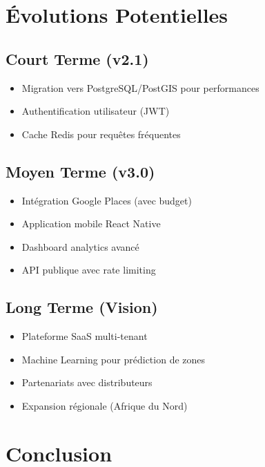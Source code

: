 \documentclass[11pt,a4paper]{article}
\begin{document}
\section{Évolutions Potentielles}

\subsection{Court Terme (v2.1)}

\begin{itemize}[leftmargin=*]
    \item Migration vers PostgreSQL/PostGIS pour performances
    \item Authentification utilisateur (JWT)
    \item Cache Redis pour requêtes fréquentes
\end{itemize}

\subsection{Moyen Terme (v3.0)}

\begin{itemize}[leftmargin=*]
    \item Intégration Google Places (avec budget)
    \item Application mobile React Native
    \item Dashboard analytics avancé
    \item API publique avec rate limiting
\end{itemize}

\subsection{Long Terme (Vision)}

\begin{itemize}[leftmargin=*]
    \item Plateforme SaaS multi-tenant
    \item Machine Learning pour prédiction de zones
    \item Partenariats avec distributeurs
    \item Expansion régionale (Afrique du Nord)
\end{itemize}


\section{Conclusion}
\end{document}

